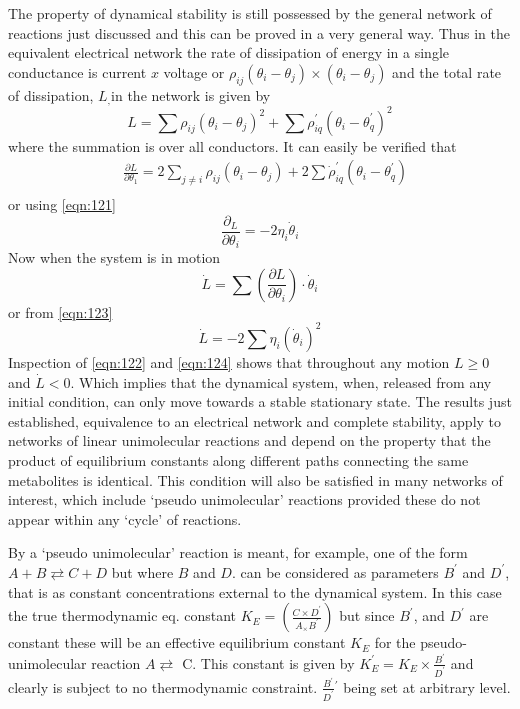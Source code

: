 The property of dynamical stability is still possessed by the general network of reactions just discussed and this can be proved in a very general way. Thus in the equivalent electrical network the rate of dissipation of energy in a single conductance is current $x$ voltage or $\rho_{ij}\left(\theta_{i}-\theta_{j}\right) \times\left(\theta_{i}-\theta_{j}\right)$ and the total rate of dissipation, $L_{,}$in the network is given by
%
\begin{equation}
L = \sum \rho_{ij}\left(\theta_{i}-\theta_{j}\right)^{2} + \sum \rho_{iq}^{\prime}\left(\theta_{i}-\theta_{q}^{\prime}\right)^{2}
\label{eqn:122}
\end{equation}
%
where the summation is over all conductors. It can easily be verified that
%
$$
\begin{aligned}
& \frac{\partial L}{\partial \theta_{1}}=2 \sum_{j \neq i} \rho_{i j}\left(\theta_{i}-\theta_{j}\right)+2 \sum \dot{\rho}_{iq}^{\prime}\left(\theta_{i}-\theta_{q}^{\prime}\right) \\
\end{aligned}
$$
or using \eqref{eqn:121}
%
\begin{equation}
\frac{\partial_{L}}{\partial \theta_{i}}=-2 \eta_{i} \dot{\theta}_{i}
\label{eqn:123}
\end{equation}
%
Now when the system is in motion
%
$$
\dot{L} = \sum \left(\frac{\partial L}{\partial \theta_{i}}\right) \cdot \dot{\theta}_{i}
$$
%
or from \eqref{eqn:123}
%
\begin{equation}
\dot{L} = -2 \sum \eta_{i}\left(\dot{\theta}_{i}\right)^{2}
\label{eqn:124}
\end{equation}
%
Inspection of \eqref{eqn:122} and \eqref{eqn:124} shows that throughout any motion $L \geqslant 0$ and $\dot{L}<0$. Which implies that the dynamical system, when, released from any initial condition, can only move towards a stable stationary state. The results just established, equivalence to an electrical network and complete stability, apply to networks of linear unimolecular reactions and depend on the property that the product of equilibrium constants along different paths connecting the same metabolites is identical. This condition will also be satisfied in many networks of interest, which include `pseudo unimolecular' reactions provided these do not appear within any `cycle' of reactions.

By a `pseudo unimolecular' reaction is meant, for example, one of the form $A+B \rightleftarrows C+D$ but where $B$ and $D$. can be considered as parameters $B^{\prime}$ and $D^{\prime}$, that is as constant concentrations external to the dynamical system. In this case the true thermodynamic eq. constant $K_{E}=\left(\frac{C \times D^{\prime}}{A_{\times} B^{\prime}}\right)$ but since $B^{\prime}$, and $D^{\prime}$ are constant these will be an effective equilibrium constant $K_{E}$ for the pseudo-unimolecular reaction $A \rightleftarrows$ C. This constant is given by $K_{E}^{\prime}=K_{E} \times \frac{B^{\prime}}{D^{\prime}}$ and clearly is subject to no thermodynamic constraint. $\frac{B^{\prime}}{D^{\prime}}{ }^{\prime}$ being set at arbitrary level.

